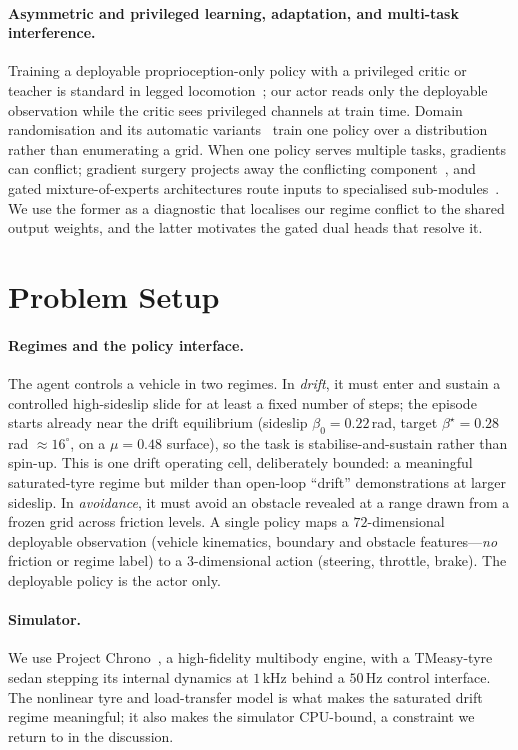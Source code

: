 \documentclass[11pt]{article}
\begin{document}
\paragraph{Asymmetric and privileged learning, adaptation, and multi-task interference.}
Training a deployable proprioception-only policy with a privileged critic or teacher is standard in
legged locomotion~\citep{lee2020learning,chen2020learning,kumar2021rma}; our actor reads only the
deployable observation while the critic sees privileged channels at train time. Domain
randomisation and its automatic variants~\citep{tobin2017domain,peng2018sim,openai2019solving}
train one policy over a distribution rather than enumerating a grid. When one policy serves multiple
tasks, gradients can conflict; gradient surgery projects away the conflicting component~\citep{yu2020gradient},
and gated mixture-of-experts architectures route inputs to specialised sub-modules~\citep{shazeer2017outrageously}.
We use the former as a diagnostic that localises our regime conflict to the shared output weights,
and the latter motivates the gated dual heads that resolve it.

\section{Problem Setup}
\paragraph{Regimes and the policy interface.}
The agent controls a vehicle in two regimes. In \emph{drift}, it must enter and sustain a
controlled high-sideslip slide for at least a fixed number of steps; the episode starts already
near the drift equilibrium (sideslip $\beta_0 = 0.22$\,rad, target $\beta^\star = 0.28$\,rad
$\approx 16^\circ$, on a $\mu = 0.48$ surface), so the task is stabilise-and-sustain rather than
spin-up. This is one drift operating cell, deliberately bounded: a meaningful saturated-tyre regime
but milder than open-loop ``drift'' demonstrations at larger sideslip. In \emph{avoidance}, it
must avoid an obstacle revealed at a range
drawn from a frozen grid across friction levels. A single policy maps a $72$-dimensional
deployable observation (vehicle kinematics, boundary and obstacle features---\emph{no} friction or
regime label) to a $3$-dimensional action (steering, throttle, brake). The deployable policy is the
actor only.

\paragraph{Simulator.}
We use Project Chrono~\citep{projectchrono}, a high-fidelity multibody engine, with a TMeasy-tyre
sedan stepping its internal dynamics at \mbox{$1$\,kHz} behind a $50$\,Hz control interface. The
nonlinear tyre and load-transfer model is what makes the saturated drift regime meaningful; it also
makes the simulator CPU-bound, a constraint we return to in the discussion.
\end{document}
